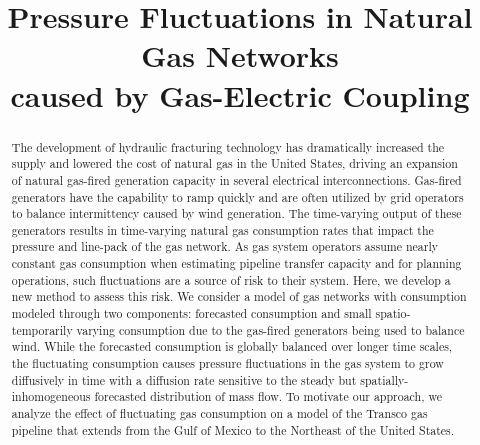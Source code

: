 \documentclass[10pt, conference, compsocconf]{IEEEtran}
\begin{document}
\title{Pressure Fluctuations in Natural Gas Networks\\ caused by Gas-Electric Coupling}





\author{
\and
{}
\and
{}
\and
{}
\and
{}
}

\maketitle


\begin{abstract}
The development of hydraulic fracturing technology has dramatically increased the supply and lowered the cost of natural gas in the United States, driving an expansion of natural gas-fired generation capacity in several electrical interconnections. Gas-fired generators have the capability to ramp quickly and are often utilized by grid operators to balance intermittency caused by wind generation.  The time-varying output of these generators results in time-varying natural gas consumption rates that impact the pressure and line-pack of the gas network.
As gas system operators assume nearly constant gas consumption when estimating pipeline transfer capacity and for planning operations, such fluctuations are a source of risk to their system. Here, we develop a new method to assess this risk. We consider a model of gas networks with consumption modeled through two components: forecasted consumption and small spatio-temporarily varying consumption due to the gas-fired generators being used to balance wind. While the forecasted consumption is globally balanced over longer time scales, the fluctuating consumption causes pressure fluctuations in the gas system to grow diffusively in time with a diffusion rate sensitive to the steady but spatially-inhomogeneous forecasted distribution of mass flow. To motivate our approach, we analyze the effect of fluctuating gas consumption on a model of the Transco gas pipeline that extends from the Gulf of Mexico to the Northeast of the United States.
\end{abstract}
\end{document}
